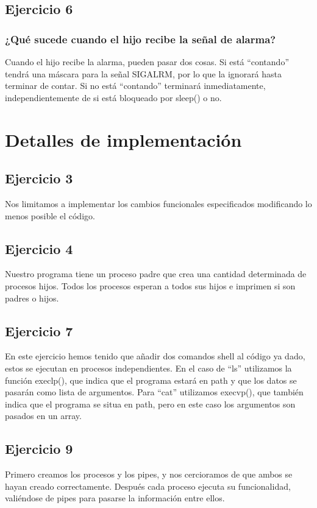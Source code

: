 \documentclass[]{article}
\begin{document}
\subsection*{Ejercicio 6}
\subsubsection*{¿Qué sucede cuando el hijo recibe la señal de alarma?}
Cuando el hijo recibe la alarma, pueden pasar dos cosas. Si está ``contando'' tendrá una máscara para la señal SIGALRM, por lo que la ignorará hasta terminar de contar. Si no está ``contando'' terminará inmediatamente, independientemente de si está bloqueado por sleep() o no.

\section*{Detalles de implementación}
\subsection*{Ejercicio 3}
Nos limitamos a implementar los cambios funcionales especificados modificando lo menos posible el código.

\subsection*{Ejercicio 4}
Nuestro programa tiene un proceso padre que crea una cantidad determinada de procesos hijos. Todos los procesos esperan a todos sus hijos e imprimen si son padres o hijos.

\subsection*{Ejercicio 7}
En este ejercicio hemos tenido que añadir dos comandos shell al código ya dado, estos se ejecutan en procesos independientes. En el caso de ``ls'' utilizamos la función execlp(), que indica que el programa estará en path y que los datos se pasarán como lista de argumentos. Para ``cat'' utilizamos execvp(), que también indica que el programa se situa en path, pero en este caso los argumentos son pasados en un array.

\subsection*{Ejercicio 9}
Primero creamos los procesos y los pipes, y nos cercioramos de que ambos se hayan creado correctamente. Después cada proceso ejecuta su funcionalidad, valiéndose de pipes para pasarse la información entre ellos.
\end{document}
